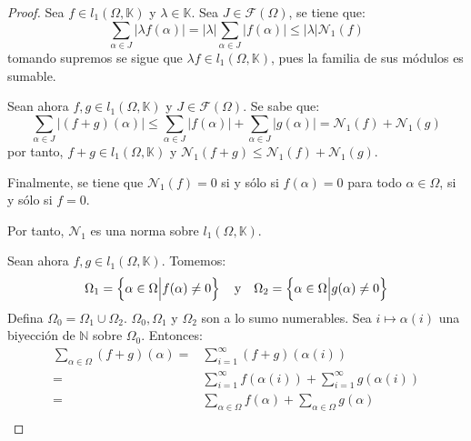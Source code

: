 \documentclass[12pt]{report}
\theoremstyle{largebreak}
\newcommand\abs[1]{\ensuremath{\big|#1\big|}}
\begin{document}
    \begin{proof}
        Sea $f\in l_1(\Omega,\mathbb{K})$ y $\lambda\in\mathbb{K}$. Sea $J\in\mathcal{F}(\Omega)$, se tiene que:
        \begin{equation*}
            \sum_{\alpha\in J }\abs{\lambda f(\alpha)}=\abs{\lambda} \sum_{\alpha\in J }\abs{f(\alpha)}\leq\abs{\lambda}\mathcal{N}_1(f)
        \end{equation*}
        tomando supremos se sigue que $\lambda f\in l_1(\Omega,\mathbb{K})$, pues la familia de sus módulos es sumable.

        Sean ahora $f,g\in l_1(\Omega,\mathbb{K})$ y $J\in\mathcal{F}(\Omega)$. Se sabe que:
        \begin{equation*}
            \sum_{\alpha\in J }\abs{(f+g)(\alpha)}\leq \sum_{\alpha\in J }\abs{f(\alpha)}+\sum_{\alpha\in J }\abs{g(\alpha)}=\mathcal{N}_1(f)+\mathcal{N}_1(g)
        \end{equation*}
        por tanto, $f+g\in l_1(\Omega,\mathbb{K})$ y $\mathcal{N}_1(f+g)\leq\mathcal{N}_1(f)+\mathcal{N}_1(g)$.

        Finalmente, se tiene que $\mathcal{N}_1(f)=0$ si y sólo si $f(\alpha)=0$ para todo $\alpha\in\Omega$, si y sólo si $f=0$.

        Por tanto, $\mathcal{N}_1$ es una norma sobre $l_1(\Omega,\mathbb{K})$.

        Sean ahora $f,g\in l_1(\Omega,\mathbb{K})$. Tomemos:
        \begin{equation*}
            \Omega_1=\left\{\alpha\in\Omega\Big|f(\alpha)\neq0 \right\}\quad\textup{y}\quad\Omega_2=\left\{\alpha\in\Omega\Big|g(\alpha)\neq0 \right\}
        \end{equation*}
        Defina $\Omega_0=\Omega_1\cup\Omega_2$. $\Omega_0,\Omega_1$ y $\Omega_2$ son a lo sumo numerables. Sea $i\mapsto\alpha(i)$ una biyección de $\mathbb{N}$ sobre $\Omega_0$. Entonces:
        \begin{equation*}
            \begin{split}
                \sum_{\alpha\in\Omega }(f+g)(\alpha)=&\sum_{i=1 }^\infty(f+g)(\alpha(i))\\
                =&\sum_{i=1 }^\infty f(\alpha(i))+\sum_{i=1 }^\infty g(\alpha(i))\\
                =&\sum_{\alpha\in\Omega }f(\alpha)+\sum_{\alpha\in\Omega }g(\alpha)\\
            \end{split}
        \end{equation*}
    \end{proof}
\end{document}
